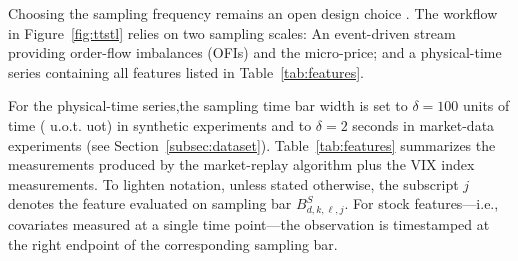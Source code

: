 \documentclass[10pt,a4paper,oneside]{article}
\providecommand{\DIFaddtex}[1]{{\protect\color{blue} \sf #1}} %
\providecommand{\DIFdeltex}[1]{{\protect\color{red} \scriptsize #1}} %
\providecommand{\DIFaddbegin}{} %
\providecommand{\DIFaddend}{} %
\providecommand{\DIFdelbegin}{} %
\providecommand{\DIFdelend}{} %
\providecommand{\DIFadd}[1]{\texorpdfstring{\DIFaddtex{#1}}{#1}} %
\providecommand{\DIFdel}[1]{\texorpdfstring{\DIFdeltex{#1}}{}} %
\newcommand{\DIFscaledelfig}{0.5}
\newlength{\DIFdelgraphicswidth} %
\newlength{\DIFdelgraphicsheight} %
\newcommand{\DIFaddincludegraphics}[2][]{{\color{blue}\fbox{\DIFOincludegraphics[#1]{#2}}}} %
\newcommand{\DIFdelincludegraphics}[2][]{%
\sbox{\DIFdelgraphicsbox}{\DIFOincludegraphics[#1]{#2}}%
\settoboxwidth{\DIFdelgraphicswidth}{\DIFdelgraphicsbox} %
\settoboxtotalheight{\DIFdelgraphicsheight}{\DIFdelgraphicsbox} %
\scalebox{\DIFscaledelfig}{%
\parbox[b]{\DIFdelgraphicswidth}{\usebox{\DIFdelgraphicsbox}\\[-\baselineskip] \rule{\DIFdelgraphicswidth}{0em}}\llap{\resizebox{\DIFdelgraphicswidth}{\DIFdelgraphicsheight}{%
\setlength{\unitlength}{\DIFdelgraphicswidth}%
\begin{picture}(1,1)%
\thicklines\linethickness{2pt} %
{\color[rgb]{1,0,0}\put(0,0){\framebox(1,1){}}}%
{\color[rgb]{1,0,0}\put(0,0){\line( 1,1){1}}}%
{\color[rgb]{1,0,0}\put(0,1){\line(1,-1){1}}}%
\end{picture}%
}\hspace*{3pt}}} %
} %
\DeclareRobustCommand{\DIFaddbegin}{\DIFOaddbegin \let\includegraphics\DIFaddincludegraphics} %
\DeclareRobustCommand{\DIFaddend}{\DIFOaddend \let\includegraphics\DIFOincludegraphics} %
\DeclareRobustCommand{\DIFdelbegin}{\DIFOdelbegin \let\includegraphics\DIFdelincludegraphics} %
\DeclareRobustCommand{\DIFdelend}{\DIFOaddend \let\includegraphics\DIFOincludegraphics} %
\begin{document}
\DIFdelbegin %

\DIFdelend Choosing the sampling frequency remains an open design choice \cite{dutta2023review}. The workflow in Figure~\ref{fig:ttstl} relies on two sampling scales: An event-driven stream providing order-flow imbalances (OFIs) and the micro-price; and a physical-time series containing all features listed in Table~\ref{tab:features}.

For the physical-time series,the sampling time bar width is set to $\delta=100$ units of time (\DIFdelbegin \DIFdel{u.o.t.}\DIFdelend \DIFaddbegin \DIFadd{uot}\DIFaddend ) in synthetic experiments and to $\delta=2$ seconds in market-data experiments (see Section~\ref{subsec:dataset}). Table~\ref{tab:features} summarizes the measurements produced by the market-replay algorithm plus the VIX index measurements. To lighten notation, unless stated otherwise, the subscript $j$ denotes the feature evaluated on sampling bar $B^{S}_{d,k,\ell,j}$. For stock features—i.e., covariates measured at a single time point—the observation is timestamped at the right endpoint of the corresponding sampling bar.


\end{document}

